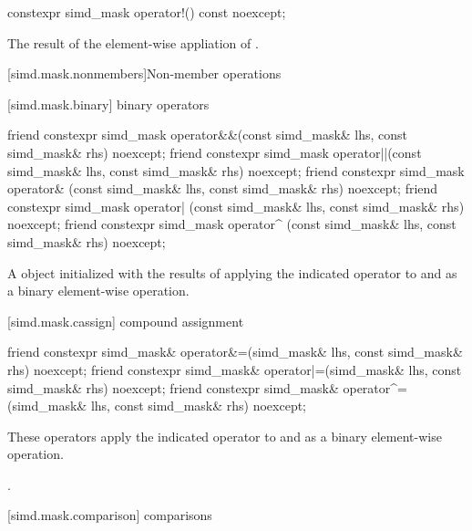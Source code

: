 \begin{itemdecl}
constexpr simd_mask operator!() const noexcept;
\end{itemdecl}

\begin{itemdescr}
  \pnum\returns
  The result of the element-wise appliation of .
\end{itemdescr}

[simd.mask.nonmembers]{Non-member operations}

[simd.mask.binary]{\texorpdfstring{ binary}{simd_mask binary} operators}

\begin{itemdecl}
friend constexpr simd_mask operator&&(const simd_mask& lhs, const simd_mask& rhs) noexcept;
friend constexpr simd_mask operator||(const simd_mask& lhs, const simd_mask& rhs) noexcept;
friend constexpr simd_mask operator& (const simd_mask& lhs, const simd_mask& rhs) noexcept;
friend constexpr simd_mask operator| (const simd_mask& lhs, const simd_mask& rhs) noexcept;
friend constexpr simd_mask operator^ (const simd_mask& lhs, const simd_mask& rhs) noexcept;
\end{itemdecl}

\begin{itemdescr}
  \pnum\returns
  A  object initialized with the results of applying the indicated operator to  and  as a binary element-wise operation.
\end{itemdescr}

[simd.mask.cassign]{\texorpdfstring{ compound}{simd_mask compound} assignment}

\begin{itemdecl}
friend constexpr simd_mask& operator&=(simd_mask& lhs, const simd_mask& rhs) noexcept;
friend constexpr simd_mask& operator|=(simd_mask& lhs, const simd_mask& rhs) noexcept;
friend constexpr simd_mask& operator^=(simd_mask& lhs, const simd_mask& rhs) noexcept;
\end{itemdecl}

\begin{itemdescr}
  \pnum\effects
  These operators apply the indicated operator to  and  as a binary element-wise operation.

  \pnum\returns
  .
\end{itemdescr}

[simd.mask.comparison]{\texorpdfstring{ comparisons}{simd_mask comparisons}}

